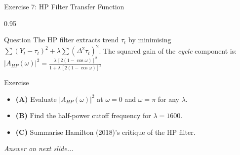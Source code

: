 \documentclass[9pt, aspectratio=169, t]{beamer}
\begin{document}
\begin{frame}{Exercise 7: HP Filter Transfer Function}
    \begin{cminipage}{0.95\textwidth}
    {\small
    \begin{alertblock}{Question}
        The HP filter extracts trend $\tau_t$ by minimising
        $\sum(Y_t-\tau_t)^2 + \lambda\sum(\Delta^2\tau_t)^2$.
        The squared gain of the \emph{cycle} component is:
        $|A_{HP}(\omega)|^2 = \frac{\lambda\,[2(1-\cos\omega)]^2}{1 + \lambda\,[2(1-\cos\omega)]^2}$
    \end{alertblock}

    \vspace{0.15cm}

    \begin{block}{Exercise}
        \begin{itemize}\setlength{\itemsep}{3pt}
            \item \textcolor{MainBlue}{\textbf{(A)}} Evaluate $|A_{HP}(\omega)|^2$ at $\omega = 0$ and $\omega = \pi$ for any $\lambda$.
            \item \textcolor{MainBlue}{\textbf{(B)}} Find the half-power cutoff frequency for $\lambda = 1600$.
            \item \textcolor{MainBlue}{\textbf{(C)}} Summarise Hamilton (2018)'s critique of the HP filter.
        \end{itemize}
    \end{block}

    \vspace{0.15cm}

    \begin{center}
        \textit{Answer on next slide...}
    \end{center}
    }
    \end{cminipage}
\end{frame}
\end{document}
